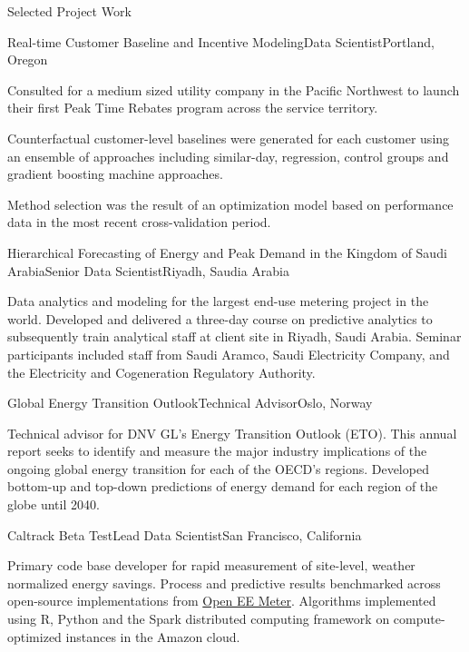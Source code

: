 \documentclass{resume} %
\begin{document}
\begin{rSection}{Selected Project Work}
\begin{rSubsection}{Real-time Customer Baseline and Incentive Modeling}{}{Data Scientist}{Portland, Oregon}
\item[] Consulted for a medium sized utility company in the Pacific Northwest to launch their first
Peak Time Rebates program across the service territory.
\item[] Counterfactual customer-level baselines were generated for each customer using an ensemble of approaches including similar-day, regression, control groups and gradient boosting machine approaches.
\item[] Method selection was the result of an optimization model based on performance data in the most recent cross-validation period.
\end{rSubsection}

\begin{rSubsection}{Hierarchical Forecasting of Energy and Peak Demand in the Kingdom of Saudi Arabia}{}{Senior Data Scientist}{Riyadh, Saudia Arabia}
\item[] Data analytics and modeling for the largest end-use metering project in the world. Developed and delivered a three-day course on predictive analytics to subsequently train analytical staff at client site in Riyadh, Saudi Arabia. Seminar participants included staff from Saudi Aramco, Saudi Electricity Company, and the Electricity and Cogeneration Regulatory Authority.

\end{rSubsection}

\pagebreak

\begin{rSubsection}{Global Energy Transition Outlook}{}{Technical Advisor}{Oslo, Norway}
\item[] Technical advisor for DNV GL's Energy Transition Outlook (ETO). This annual report seeks to identify and measure the major industry implications of the ongoing global energy transition for each of the OECD's regions. Developed bottom-up and top-down predictions of energy demand for each region of the globe until 2040.
\end{rSubsection}

\begin{rSubsection}{Caltrack Beta Test}{}{Lead Data Scientist}{San Francisco, California}
\item[] Primary code base developer for rapid measurement of site-level, weather normalized energy savings. Process and predictive results benchmarked across open-source implementations from \href{https://github.com/impactlab/caltrack}{Open EE Meter}. Algorithms implemented using R, Python and the Spark distributed computing framework on compute-optimized instances in the Amazon cloud.
\end{rSubsection}


\end{rSection}
\end{document}
